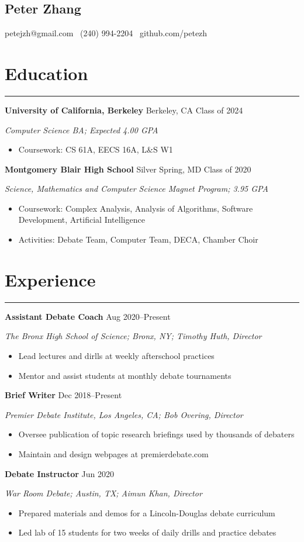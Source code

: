 \documentclass[11pt]{article}
\newcommand{\name}[1]{\begin{center}\section*{\huge \color{highlight} #1}\end{center}}
\newcommand{\topinfo}[1]{\begin{center}\vspace{-0.2cm}#1\vspace{-0.2cm}\end{center}}
\newcommand{\resumesection}[1]{\vspace{-0.3cm}\section*{\color{highlight}#1}\vspace{-0.3cm}\hrule\vspace{0.3cm}}
\begin{document}
\name{Peter Zhang}
\topinfo{petejzh@gmail.com \textbullet\ (240) 994-2204 \textbullet\ github.com/petezh}

\resumesection{Education}

\textbf{University of California, Berkeley} Berkeley, CA \hfill Class of 2024 \par
\textit{Computer Science BA; Expected 4.00 GPA}
\begin{itemize}
	\item Coursework: CS 61A, EECS 16A, L\&S W1
\end{itemize}

\textbf{Montgomery Blair High School} Silver Spring, MD \hfill Class of 2020 \par
\textit{Science, Mathematics and Computer Science Magnet Program; 3.95 GPA}

\begin{itemize}
	\item Coursework: Complex Analysis, Analysis of Algorithms, Software Development, Artificial Intelligence
	\item Activities: Debate Team, Computer Team, DECA, Chamber Choir
\end{itemize}

\resumesection{Experience}

\textbf{Assistant Debate Coach}  \hfill Aug 2020--Present \par
\textit{The Bronx High School of Science; Bronx, NY; Timothy Huth, Director}
\begin{itemize}
	\item Lead lectures and dirlls at weekly afterschool practices
	\item Mentor and assist students at monthly debate tournaments
\end{itemize}

\textbf{Brief Writer}   \hfill Dec 2018--Present \par
\textit{Premier Debate Institute, Los Angeles, CA; Bob Overing, Director}
\begin{itemize}
	\item Oversee publication of topic research briefings used by thousands of debaters
	\item Maintain and design webpages at premierdebate.com
\end{itemize}

\textbf{Debate Instructor}  \hfill Jun 2020 \par
\textit{War Room Debate; Austin, TX; Aimun Khan, Director}
\begin{itemize}
	\item Prepared materials and demos for a Lincoln-Douglas debate curriculum
	\item Led lab of 15 students for two weeks of daily drills and practice debates
\end{itemize}
\end{document}
